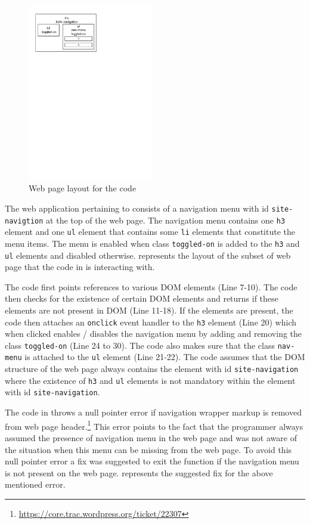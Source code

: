 	\begin{figure}
		\centering
		\includegraphics[width=55mm]{images/layout.pdf}
		\caption{Web page layout for the \javascript code}
		\label{Fig:Layout}
	\end{figure}
	
	The web application pertaining to  consists of a navigation menu with id \texttt{site-navigtion} at the top of the web page. The navigation menu contains one \texttt{h3} element and one \texttt{ul} element that contains some \texttt{li} elements that constitute the menu items. The menu is enabled when class \texttt{toggled-on} is added to the \texttt{h3} and \texttt{ul} elements and disabled otherwise.  represents the layout of the subset of web page that the \javascript code in  is interacting with.
	
	The \javascript code first points references to various DOM elements (Line 7-10). The code then checks for the existence of certain DOM elements and returns if these elements are not present in DOM (Line 11-18). If the elements are present, the code then attaches an \texttt{onclick} event handler to the \texttt{h3} element (Line 20) which when clicked enables / disables the navigation menu by adding and removing the class \texttt{toggled-on} (Line 24 to 30). The code also makes sure that the class \texttt{nav-menu} is attached to the \texttt{ul} element (Line 21-22). The \javascript code assumes that the DOM structure of the web page always contains the element with id \texttt{site-navigation} where the existence of \texttt{h3} and \texttt{ul} elements is not mandatory within the element with id \texttt{site-navigation}.
	
	The \javascript code in  throws a null pointer error if navigation wrapper markup is removed from web page header.\footnote{\url{https://core.trac.wordpress.org/ticket/22307}} This error points to the fact that the programmer always assumed the presence of navigation menu in the web page and was not aware of the situation when this menu can be missing from the web page. To avoid this null pointer error a fix was suggested to exit the function if the navigation menu is not present on the web page.  represents the suggested fix for the above mentioned error.
	
